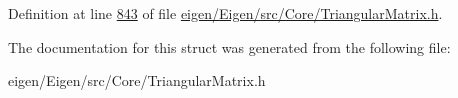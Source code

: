 Definition at line \hyperlink{eigen_2_eigen_2src_2_core_2_triangular_matrix_8h_source_l00843}{843} of file \hyperlink{eigen_2_eigen_2src_2_core_2_triangular_matrix_8h_source}{eigen/\+Eigen/src/\+Core/\+Triangular\+Matrix.\+h}.



The documentation for this struct was generated from the following file\+:\begin{DoxyCompactItemize}
\item 
eigen/\+Eigen/src/\+Core/\+Triangular\+Matrix.\+h\end{DoxyCompactItemize}
